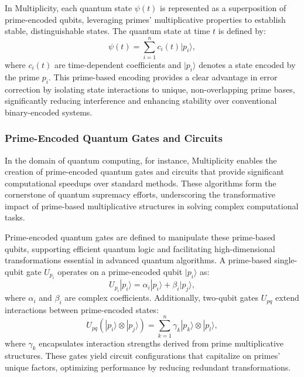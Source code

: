 \documentclass{article}
\theoremstyle{plain}
\newcommand{\primeQubit}[1]{|p_{#1}\rangle}
\newcommand{\primeGate}[1]{U_{p_{#1}}}
\begin{document}
In Multiplicity, each quantum state \( \psi(t) \) is represented as a superposition of prime-encoded qubits, leveraging primes’ multiplicative properties to establish stable, distinguishable states. The quantum state at time \( t \) is defined by:
\begin{equation}
    \psi(t) = \sum_{i=1}^{n} c_i(t) \primeQubit{i},
\end{equation}
where \( c_i(t) \) are time-dependent coefficients and \( \primeQubit{i} \) denotes a state encoded by the prime \( p_i \). This prime-based encoding provides a clear advantage in error correction by isolating state interactions to unique, non-overlapping prime bases, significantly reducing interference and enhancing stability over conventional binary-encoded systems.

\subsubsection{Prime-Encoded Quantum Gates and Circuits}
In the domain of quantum computing, for instance, Multiplicity enables the creation of prime-encoded quantum gates and circuits that provide significant computational speedups over standard methods. These algorithms form the cornerstone of quantum supremacy efforts, underscoring the transformative impact of prime-based multiplicative structures in solving complex computational tasks.

Prime-encoded quantum gates are defined to manipulate these prime-based qubits, supporting efficient quantum logic and facilitating high-dimensional transformations essential in advanced quantum algorithms. A prime-based single-qubit gate \( \primeGate{i} \) operates on a prime-encoded qubit \( \primeQubit{i} \) as:
\begin{equation}
    \primeGate{i} \primeQubit{i} = \alpha_i \primeQubit{i} + \beta_i \primeQubit{j},
\end{equation}
where \( \alpha_i \) and \( \beta_i \) are complex coefficients. Additionally, two-qubit gates \( U_{pq} \) extend interactions between prime-encoded states:
\begin{equation}
    U_{pq} \left( \primeQubit{i} \otimes \primeQubit{j} \right) = \sum_{k=1}^{n} \gamma_k \primeQubit{k} \otimes \primeQubit{l},
\end{equation}
where \( \gamma_k \) encapsulates interaction strengths derived from prime multiplicative structures. These gates yield circuit configurations that capitalize on primes’ unique factors, optimizing performance by reducing redundant transformations.
\end{document}
